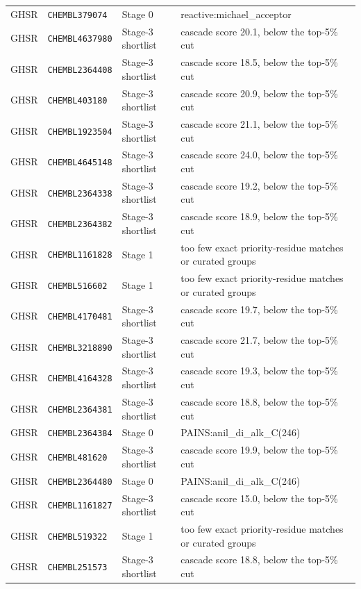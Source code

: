 {\begin{longtable}{@{}llp{}p{}@{}}
GHSR & \texttt{CHEMBL379074} & Stage 0 & reactive:michael\_acceptor \\
GHSR & \texttt{CHEMBL4637980} & Stage-3 shortlist & cascade score 20.1, below the top-5\% cut \\
GHSR & \texttt{CHEMBL2364408} & Stage-3 shortlist & cascade score 18.5, below the top-5\% cut \\
GHSR & \texttt{CHEMBL403180} & Stage-3 shortlist & cascade score 20.9, below the top-5\% cut \\
GHSR & \texttt{CHEMBL1923504} & Stage-3 shortlist & cascade score 21.1, below the top-5\% cut \\
GHSR & \texttt{CHEMBL4645148} & Stage-3 shortlist & cascade score 24.0, below the top-5\% cut \\
GHSR & \texttt{CHEMBL2364338} & Stage-3 shortlist & cascade score 19.2, below the top-5\% cut \\
GHSR & \texttt{CHEMBL2364382} & Stage-3 shortlist & cascade score 18.9, below the top-5\% cut \\
GHSR & \texttt{CHEMBL1161828} & Stage 1 & too few exact priority-residue matches or curated groups \\
GHSR & \texttt{CHEMBL516602} & Stage 1 & too few exact priority-residue matches or curated groups \\
GHSR & \texttt{CHEMBL4170481} & Stage-3 shortlist & cascade score 19.7, below the top-5\% cut \\
GHSR & \texttt{CHEMBL3218890} & Stage-3 shortlist & cascade score 21.7, below the top-5\% cut \\
GHSR & \texttt{CHEMBL4164328} & Stage-3 shortlist & cascade score 19.3, below the top-5\% cut \\
GHSR & \texttt{CHEMBL2364381} & Stage-3 shortlist & cascade score 18.8, below the top-5\% cut \\
GHSR & \texttt{CHEMBL2364384} & Stage 0 & PAINS:anil\_di\_alk\_C(246) \\
GHSR & \texttt{CHEMBL481620} & Stage-3 shortlist & cascade score 19.9, below the top-5\% cut \\
GHSR & \texttt{CHEMBL2364480} & Stage 0 & PAINS:anil\_di\_alk\_C(246) \\
GHSR & \texttt{CHEMBL1161827} & Stage-3 shortlist & cascade score 15.0, below the top-5\% cut \\
GHSR & \texttt{CHEMBL519322} & Stage 1 & too few exact priority-residue matches or curated groups \\
GHSR & \texttt{CHEMBL251573} & Stage-3 shortlist & cascade score 18.8, below the top-5\% cut \\

\end{longtable}}
